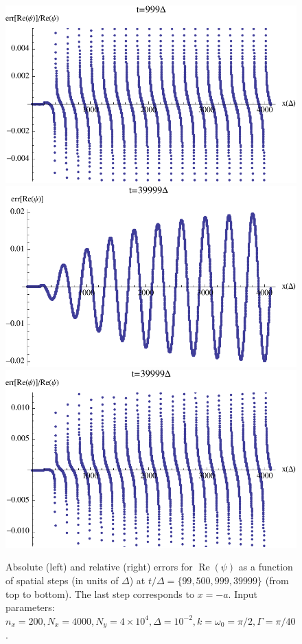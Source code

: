 \documentclass[final,1p,times]{elsarticle}
\DeclareMathOperator{\re}{Re}
\begin{document}
\begin{figure}[htbp]
	\includegraphics[scale=0.5]{rel_error_t_999}\\
	\vspace{0.5cm}
	\includegraphics[scale=0.5]{abs_error_t_39999}
	\includegraphics[scale=0.5]{rel_error_t_39999}
	\caption{Absolute (left) and relative (right) errors for $\re(\psi)$ as a function of spatial steps (in units of $\Delta$) at $t/\Delta=\{99, 500, 999, 39999\}$ (from top to bottom). The last step corresponds to $x=-a$. Input parameters: $n_x=200, N_x=4000, N_y=4\times10^4, \Delta=10^{-2}, k=\omega_0=\pi/2, \Gamma=\pi/40$.}
	\label{fig:error}
\end{figure}
\end{document}
